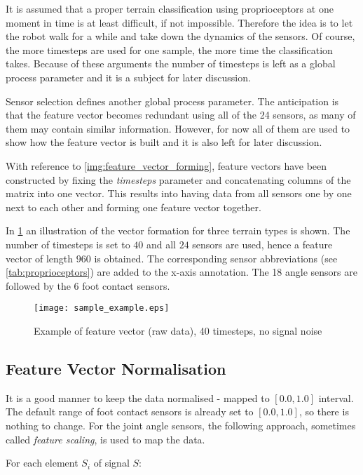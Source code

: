 It is assumed that a proper terrain classification using proprioceptors at one moment in time is at least difficult, if not impossible. Therefore the idea is to let the robot walk for a while and take down the dynamics of the sensors. Of course, the more timesteps are used for one sample, the more time the classification takes. Because of these arguments the number of timesteps is left as a global process parameter and it is a subject for later discussion.

Sensor selection defines another global process parameter. The anticipation is that the feature vector becomes redundant using all of the 24 sensors, as many of them may contain similar information. However, for now all of them are used to show how the feature vector is built and it is also left for later discussion.

With reference to \cref{img:feature_vector_forming}, feature vectors have been constructed by fixing the \textit{timesteps} parameter and concatenating columns of the matrix into one vector. This results into having data from all sensors one by one next to each other and forming one feature vector together. 

In \cref{fig:sample_example} an illustration of the vector formation for three terrain types is shown. The number of timesteps is set to $ 40 $ and all $ 24 $ sensors are used, hence a feature vector of length $ 960 $ is obtained. The corresponding sensor abbreviations (see \cref{tab:proprioceptors}) are added to the x-axis annotation. The 18 angle sensors are followed by the 6 foot contact sensors.

\begin{figure}[H]
  \centering
  \texttt{[image: sample\_example.eps]}
  \caption{Example of feature vector (raw data), 40 timesteps, no signal noise}
  \label{fig:sample_example}
\end{figure}

\subsection{Feature Vector Normalisation} \label{ssec:normalisation}
It is a good manner to keep the data normalised - mapped to $ [0.0, 1.0] $ interval. The default range of foot contact sensors is already set to $ [0.0, 1.0] $, so there is nothing to change. For the joint angle sensors, the following approach, sometimes called \textit{feature scaling}, is used to map the data.

For each element $ S_i $ of signal $ S $:

